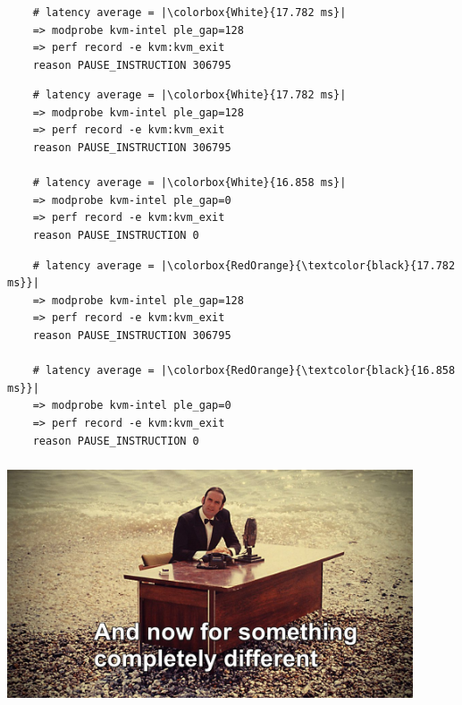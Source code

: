 \documentclass[usenames,dvipsnames, 18pt, compress, aspectratio=169]{beamer}
\begin{document}
\begin{frame}[fragile]{}
    \frametitle{}
    \begin{center}

    \begin{overprint}
        \begin{verbatim}
    # latency average = |\colorbox{White}{17.782 ms}|
    => modprobe kvm-intel ple_gap=128
    => perf record -e kvm:kvm_exit
    reason PAUSE_INSTRUCTION 306795
        \end{verbatim}

        \begin{verbatim}
    # latency average = |\colorbox{White}{17.782 ms}|
    => modprobe kvm-intel ple_gap=128
    => perf record -e kvm:kvm_exit
    reason PAUSE_INSTRUCTION 306795

    # latency average = |\colorbox{White}{16.858 ms}|
    => modprobe kvm-intel ple_gap=0
    => perf record -e kvm:kvm_exit
    reason PAUSE_INSTRUCTION 0
        \end{verbatim}

        \begin{verbatim}
    # latency average = |\colorbox{RedOrange}{\textcolor{black}{17.782 ms}}|
    => modprobe kvm-intel ple_gap=128
    => perf record -e kvm:kvm_exit
    reason PAUSE_INSTRUCTION 306795

    # latency average = |\colorbox{RedOrange}{\textcolor{black}{16.858 ms}}|
    => modprobe kvm-intel ple_gap=0
    => perf record -e kvm:kvm_exit
    reason PAUSE_INSTRUCTION 0
        \end{verbatim}

    \end{overprint}
    \end{center}
\end{frame}

\begin{frame}
    \frametitle{}
    \begin{center}

    \includegraphics[width=0.9\textwidth,center]{different.jpg}

    \end{center}
\end{frame}
\end{document}
